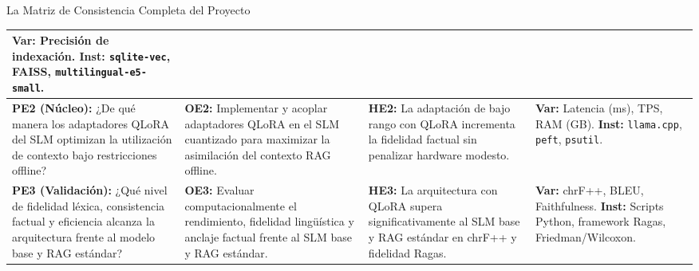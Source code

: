\documentclass[aspectratio=169, 10pt, spanish]{beamer}
\begin{document}
\begin{frame}{La Matriz de Consistencia Completa del Proyecto}
\begin{center}
\begin{tabularx}{\textwidth}{|>{\raggedright\arraybackslash}p{3.1cm}|>{\raggedright\arraybackslash}p{3.3cm}|>{\raggedright\arraybackslash}p{3.3cm}|>{\raggedright\arraybackslash}X|}
        \textbf{Var:} Precisión de indexación.\newline
        \textbf{Inst:} \texttt{sqlite-vec}, FAISS, \texttt{multilingual-e5-small}. \\
        \hline
        \textbf{PE2 (Núcleo):} ¿De qué manera los adaptadores QLoRA del SLM optimizan la utilización de contexto bajo restricciones offline? & 
        \textbf{OE2:} Implementar y acoplar adaptadores QLoRA en el SLM cuantizado para maximizar la asimilación del contexto RAG offline. & 
        \textbf{HE2:} La adaptación de bajo rango con QLoRA incrementa la fidelidad factual sin penalizar hardware modesto. & 
        \textbf{Var:} Latencia (ms), TPS, RAM (GB).\newline
        \textbf{Inst:} \texttt{llama.cpp}, \texttt{peft}, \texttt{psutil}. \\
        \hline
        \textbf{PE3 (Validación):} ¿Qué nivel de fidelidad léxica, consistencia factual y eficiencia alcanza la arquitectura frente al modelo base y RAG estándar? & 
        \textbf{OE3:} Evaluar computacionalmente el rendimiento, fidelidad lingüística y anclaje factual frente al SLM base y RAG estándar. & 
        \textbf{HE3:} La arquitectura con QLoRA supera significativamente al SLM base y RAG estándar en chrF++ y fidelidad Ragas. & 
        \textbf{Var:} chrF++, BLEU, Faithfulness.\newline
        \textbf{Inst:} Scripts Python, framework Ragas, Friedman/Wilcoxon. \\
        \hline
    \end{tabularx}
    \end{center}
\end{frame}
\end{document}
